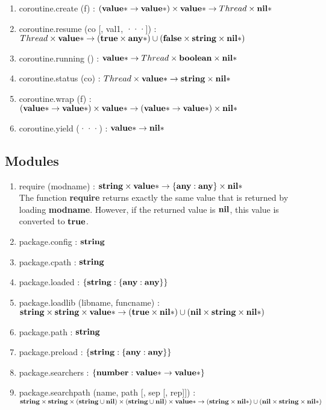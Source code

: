 \begin{enumerate}
\item coroutine.create (f) :
$(\mathbf{value}{*} \rightarrow \mathbf{value}{*}) \times \mathbf{value}{*} \rightarrow Thread \times \mathbf{nil}{*}$
\item coroutine.resume (co [, val1, ···]) :
$Thread \times
\mathbf{value}{*} \rightarrow
(\mathbf{true} \times \mathbf{any}{*}) \cup
(\mathbf{false} \times \mathbf{string} \times \mathbf{nil}{*})$
\item coroutine.running () :
$\mathbf{value}{*} \rightarrow Thread \times \mathbf{boolean} \times \mathbf{nil}{*}$
\item coroutine.status (co) :
$Thread \times \mathbf{value}{*} \rightarrow \mathbf{string} \times \mathbf{nil}{*}$
\item coroutine.wrap (f) :
$(\mathbf{value}{*} \rightarrow \mathbf{value}{*}) \times
\mathbf{value}{*} \rightarrow
(\mathbf{value}{*} \rightarrow \mathbf{value}{*}) \times
\mathbf{nil}{*}$ 
\item coroutine.yield (···) :
$\mathbf{value}{*} \rightarrow \mathbf{nil}{*}$
\end{enumerate}

\subsection{Modules}

\begin{enumerate}
\item require (modname) :
$\mathbf{string} \times \mathbf{value}{*} \rightarrow \{\mathbf{any}:\mathbf{any}\} \times \mathbf{nil}{*}$
\\
The function \textbf{require} returns exactly the same value that is
returned by loading \textbf{modname}.
However, if the returned value is $\mathbf{nil}$, this value is
converted to $\mathbf{true}$.
\item package.config : $\mathbf{string}$
\item package.cpath : $\mathbf{string}$
\item package.loaded : $\{\mathbf{string}:\{\mathbf{any}:\mathbf{any}\}\}$
\item package.loadlib (libname, funcname) :
$\mathbf{string} \times
\mathbf{string} \times
\mathbf{value}{*} \rightarrow
(\mathbf{true} \times \mathbf{nil}{*}) \cup
(\mathbf{nil} \times \mathbf{string} \times \mathbf{nil}{*})$
\item package.path : $\mathbf{string}$
\item package.preload : $\{\mathbf{string}:\{\mathbf{any}:\mathbf{any}\}\}$
\item package.searchers : $\{\mathbf{number}:\mathbf{value}{*} \rightarrow \mathbf{value}{*}\}$
\item package.searchpath (name, path [, sep [, rep]]) :
$\mathbf{string} \times
\mathbf{string} \times
(\mathbf{string} \cup \mathbf{nil}) \times
(\mathbf{string} \cup \mathbf{nil}) \times
\mathbf{value}{*} \rightarrow
(\mathbf{string} \times \mathbf{nil}{*}) \cup
(\mathbf{nil} \times \mathbf{string} \times \mathbf{nil}{*})$
\end{enumerate}

